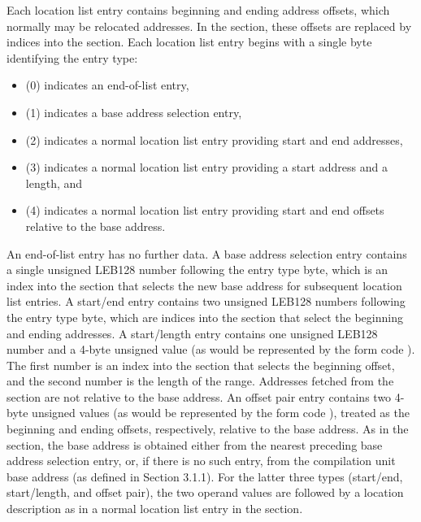 Each location list entry contains beginning and ending address
offsets, which normally may be relocated addresses. In the
\dotdebuglocdwo{} section, these offsets are replaced by indices
into the \dotdebugaddr{} section. Each location list entry begins
with a single byte identifying the entry type:
\begin{itemize}
\item
\DWLLEendoflistentry{} (0) indicates an end-of-list entry,
\item
\DWLLEbaseaddressselectionentry{} (1) indicates a base address
selection entry, 
\item
\DWLLEstartendentry{} (2) indicates a normal
location list entry providing start and end addresses,
\item
\DWLLEstartlengthentry{} (3) indicates a normal location list
entry providing a start address and a length, and
\item
\DWLLEoffsetpairentry{} (4) indicates a normal location list
entry providing start and end offsets relative to the base
address. 
\end{itemize}
An end-of-list entry has no further data. A base address
selection entry contains a single unsigned LEB128
 number
following the entry type byte, which is an index into the
\dotdebugaddr{} section that selects the new base address for
subsequent location list entries. A start/end entry contains two
unsigned LEB128 numbers 
following the entry type byte, which are
indices into the \dotdebugaddr{} section that select the beginning
and ending addresses. A start/length entry contains one unsigned
LEB128 number and a 4-byte unsigned value (as would be
represented by the form code \DWFORMdatafour). The first number
is an index into the \dotdebugaddr{} section that selects the
beginning offset, and the second number is the length of the
range. Addresses fetched from the \dotdebugaddr{} section are not
relative to the base address. An offset pair entry contains two
4-byte unsigned values (as would be represented by the form code
\DWFORMdatafour){}, treated as the beginning and ending offsets,
respectively, relative to the base address. As in the \dotdebugloc{}
section, the base address is obtained either from the nearest
preceding base address selection entry, or, if there is no such
entry, from the compilation unit base address (as defined in
Section 3.1.1). For the latter three types (start/end,
start/length, and offset pair), the two operand values are
followed by a location description as in a normal location list
entry in the \dotdebugloc{} section.

